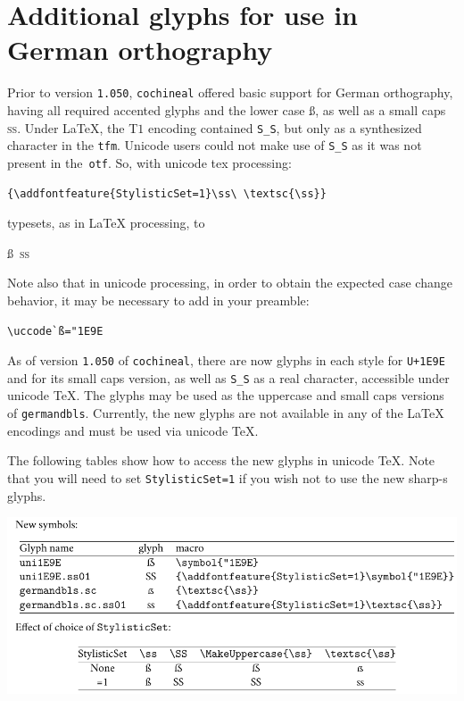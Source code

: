 \documentclass[11pt]{article}
\begin{document}
\section*{Additional glyphs for use in German orthography}
Prior to version {\tt1.050}, {\tt cochineal} offered basic support for German orthography, having all required accented glyphs and the lower case \ss, as well as a small caps \textsc{\ss}. Under LaTeX, the T$1$ encoding contained \verb|S_S|, but only as a synthesized character in the {\tt tfm}. Unicode users could not make use of \verb|S_S| as it was not present in the~{\tt otf}. So, with unicode tex processing:
\begin{verbatim}
{\addfontfeature{StylisticSet=1}\ss\ \textsc{\ss}}
\end{verbatim}
typesets, as in LaTeX processing, to

\ss\ \textsc{\ss}

Note also that in unicode processing, in order to obtain the expected case change behavior, it may be necessary to add in your preamble:
\begin{verbatim}
\uccode`ß="1E9E
\end{verbatim}


 As of version {\tt1.050} of {\tt cochineal}, there are now glyphs in each style for {\tt U+1E9E} and for its small caps version, as well as \verb|S_S| as a real character, accessible under unicode TeX. The glyphs may be used as the uppercase and small caps versions of {\tt germandbls}. Currently, the new glyphs are not available in any of the LaTeX encodings and must be used via unicode TeX.

The following tables show how to access the new glyphs in unicode TeX. Note that you will need to set {\tt StylisticSet=1} if you wish not to use the new sharp-s glyphs.

\includegraphics{newgermanglyphs-crop}
\end{document}
